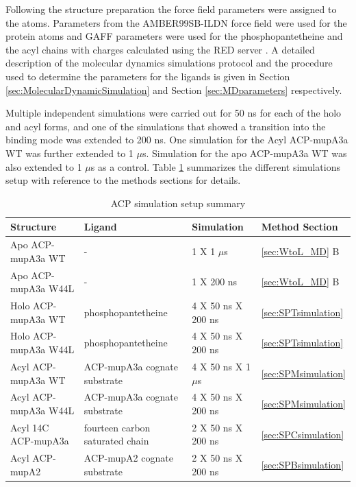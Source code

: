 	Following the structure preparation the force field parameters were assigned to the atoms. Parameters from the AMBER99SB-ILDN force field were used for the protein atoms and GAFF parameters were used for the phosphopantetheine and the acyl chains with charges calculated using the RED server \parencite{Vanquelef2011}. A detailed description of the molecular dynamics simulations protocol and the procedure used to determine the parameters for the ligands is given in Section \ref{sec:MolecularDynamicSimulation} and Section \ref{sec:MDparameters} respectively.
	
	Multiple independent simulations were carried out for 50 ns for each of the holo and acyl forms, and one of the simulations that showed a transition into the binding mode was extended to 200 ns. One simulation for the Acyl ACP-mupA3a WT was further extended to 1 $ \mu $s. Simulation for the apo ACP-mupA3a WT was also extended to 1 $ \mu $s as a control. Table \ref{tab:simulationSetupSummary} summarizes the different simulations setup with reference to the methods sections for details. 
	
	\begin{table}[htbp]
	\caption{ACP simulation setup summary}
	\begin{tabularx}{\textwidth}{XXp{2cm}p{2cm}}
	\toprule[2pt]	
	\textbf{Structure} & \textbf{Ligand} &\textbf{Simulation} & \textbf{Method Section } \\
	\midrule[1pt]
	Apo ACP-mupA3a WT & -  & 1 X 1 $\mu$s & \ref{sec:WtoL_MD} B\\[5pt] 
	Apo ACP-mupA3a W44L & - & 1 X 200 ns & \ref{sec:WtoL_MD} B\\[5pt] 
	Holo ACP-mupA3a WT & phosphopantetheine & 4 X 50 ns  \newline 1 X 200 ns & \ref{sec:SPTsimulation}\\[5pt] 
	Holo ACP-mupA3a W44L & phosphopantetheine & 4 X 50 ns  \newline 1 X 200 ns & \ref{sec:SPTsimulation}\\[3pt] 
	Acyl ACP-mupA3a WT & ACP-mupA3a cognate substrate & 4 X 50 ns \newline 1 X 1 $\mu$s & \ref{sec:SPMsimulation} \\[5pt] 
	Acyl ACP-mupA3a W44L & ACP-mupA3a cognate substrate  & 4 X 50 ns \newline 1 X 200 ns & \ref{sec:SPMsimulation} \\[5pt] 
	Acyl 14C ACP-mupA3a & fourteen carbon saturated chain& 2 X 50 ns \newline 1 X 200 ns & \ref{sec:SPCsimulation} \\[5pt] 
	Acyl ACP-mupA2 & ACP-mupA2 cognate substrate & 2 X 50 ns \newline 1 X 200 ns &  \ref{sec:SPBsimulation}  \\
	\bottomrule[2pt]
	\end{tabularx}
	\label{tab:simulationSetupSummary}
	\end{table}
	
